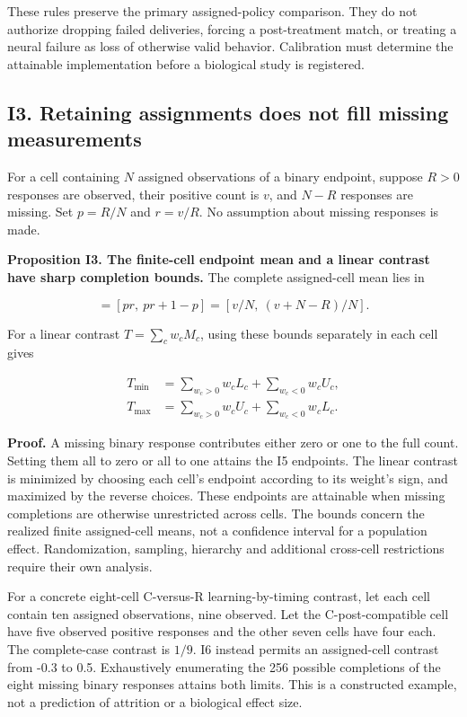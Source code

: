 \documentclass[
  american,
  11pt,
  letterpaper,
]{article}
\begin{document}
These rules preserve the primary assigned-policy comparison. They do not authorize dropping failed deliveries, forcing a post-treatment match, or treating a neural failure as loss of otherwise valid behavior. Calibration must determine the attainable implementation before a biological study is registered.

\subsection{I3. Retaining assignments does not fill missing measurements}\label{i3.-retaining-assignments-does-not-fill-missing-measurements}

For a cell containing \(N\) assigned observations of a binary endpoint, suppose \(R>0\) responses are observed, their positive count is \(v\), and \(N-R\) responses are missing. Set \(p=R/N\) and \(r=v/R\). No assumption about missing responses is made.

\textbf{Proposition I3. The finite-cell endpoint mean and a linear contrast have sharp completion bounds.} The complete assigned-cell mean lies in

\begin{equation}
[L,U]=[p r,\ p r+1-p]=[v/N,\ (v+N-R)/N].\tag{I5}
\end{equation}

For a linear contrast \(T=\sum_c w_c M_c\), using these bounds separately in each cell gives

\begin{equation}
\begin{aligned}
T_{\min}&=\sum_{w_c>0}w_cL_c+\sum_{w_c<0}w_cU_c,\\
T_{\max}&=\sum_{w_c>0}w_cU_c+\sum_{w_c<0}w_cL_c.
\end{aligned}\tag{I6}
\end{equation}

\textbf{Proof.} A missing binary response contributes either zero or one to the full count. Setting them all to zero or all to one attains the I5 endpoints. The linear contrast is minimized by choosing each cell's endpoint according to its weight's sign, and maximized by the reverse choices. These endpoints are attainable when missing completions are otherwise unrestricted across cells. The bounds concern the realized finite assigned-cell means, not a confidence interval for a population effect. Randomization, sampling, hierarchy and additional cross-cell restrictions require their own analysis.

For a concrete eight-cell C-versus-R learning-by-timing contrast, let each cell contain ten assigned observations, nine observed. Let the C-post-compatible cell have five observed positive responses and the other seven cells have four each. The complete-case contrast is \(1/9\). I6 instead permits an assigned-cell contrast from -0.3 to 0.5. Exhaustively enumerating the 256 possible completions of the eight missing binary responses attains both limits. This is a constructed example, not a prediction of attrition or a biological effect size.
\end{document}
